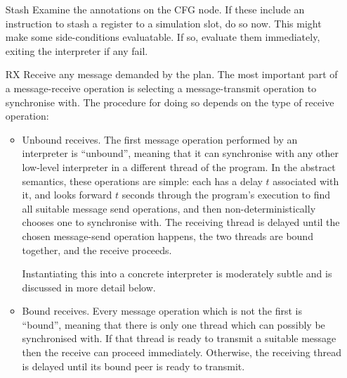\begin{itemize}
\item[Stash]
  Examine the annotations on the CFG node.
  If these include an instruction to stash a register to a simulation slot, do so now.
  This might make some side-conditions evaluatable.
  If so, evaluate them immediately, exiting the interpreter if any fail.
\item[RX]
  Receive any message demanded by the plan.
  The most important part of a message-receive operation is selecting a message-transmit operation to synchronise with.
  The procedure for doing so depends on the type of receive operation:

  \begin{itemize}
  \item
    Unbound receives.
    The first message operation performed by an interpreter is ``unbound'', meaning that it can synchronise with any other low-level interpreter in a different thread of the program.
    In the abstract semantics, these operations are simple: each has a delay $t$ associated with it, and looks forward $t$ seconds through the program's execution to find all suitable message send operations, and then non-deterministically chooses one to synchronise with.
    The receiving thread is delayed until the chosen message-send operation happens, the two threads are bound together, and the receive proceeds.

    Instantiating this into a concrete interpreter is moderately subtle and is discussed in more detail below.
  \item
    Bound receives.
    Every message operation which is not the first is ``bound'', meaning that there is only one thread which can possibly be synchronised with.
    If that thread is ready to transmit a suitable message then the receive can proceed immediately.
    Otherwise, the receiving thread is delayed until its bound peer is ready to transmit.
  \end{itemize}


\end{itemize}
